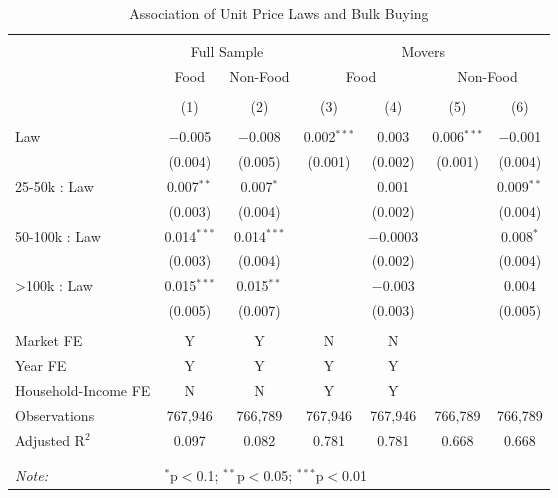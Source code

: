 
\begin{table}[!htbp] \centering
  \caption{Association of Unit Price Laws and Bulk Buying}
  \label{tab:unitPriceLaw}
\begin{tabular}{@{\extracolsep{5pt}}lcccccc}
\\[-1.8ex]\hline
\hline \\[-1.8ex]
 & \multicolumn{2}{c}{Full Sample} & \multicolumn{4}{c}{Movers} \\
 & Food & Non-Food & \multicolumn{2}{c}{Food} & \multicolumn{2}{c}{Non-Food}\\
\\[-1.8ex] & (1) & (2) & (3) & (4) & (5) & (6)\\
\hline \\[-1.8ex]
 Law & $-$0.005 & $-$0.008 & 0.002$^{***}$ & 0.003 & 0.006$^{***}$ & $-$0.001 \\
  & (0.004) & (0.005) & (0.001) & (0.002) & (0.001) & (0.004) \\
  25-50k : Law & 0.007$^{**}$ & 0.007$^{*}$ &  & 0.001 &  & 0.009$^{**}$ \\
  & (0.003) & (0.004) &  & (0.002) &  & (0.004) \\
  50-100k : Law & 0.014$^{***}$ & 0.014$^{***}$ &  & $-$0.0003 &  & 0.008$^{*}$ \\
  & (0.003) & (0.004) &  & (0.002) &  & (0.004) \\
  >100k : Law & 0.015$^{***}$ & 0.015$^{**}$ &  & $-$0.003 &  & 0.004 \\
  & (0.005) & (0.007) &  & (0.003) &  & (0.005) \\
 \hline \\[-1.8ex]
Market FE & Y & Y & N & N &  &  \\
Year FE & Y & Y & Y & Y &  &  \\
Household-Income FE & N & N & Y & Y &  &  \\
Observations & 767,946 & 766,789 & 767,946 & 767,946 & 766,789 & 766,789 \\
Adjusted R$^{2}$ & 0.097 & 0.082 & 0.781 & 0.781 & 0.668 & 0.668 \\
\\[-1.8ex]\hline
\hline \\[-1.8ex]
\textit{Note:}  & \multicolumn{6}{l}{$^{*}$p$<$0.1; $^{**}$p$<$0.05; $^{***}$p$<$0.01} \\
\end{tabular}

\end{table}
